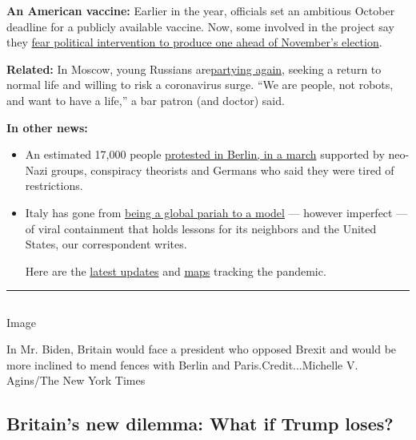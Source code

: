 \textbf{An American vaccine:} Earlier in the year, officials set an
ambitious October deadline for a publicly available vaccine. Now, some
involved in the project say they
\href{https://www.nytimes.com/2020/08/02/us/politics/coronavirus-vaccine.html}{fear
political intervention to produce one ahead of November's election}.

\textbf{Related:} In Moscow, young Russians
are\href{https://www.nytimes.com/2020/08/01/world/europe/russia-moscow-coronavirus.html}{partying
again}, seeking a return to normal life and willing to risk a
coronavirus surge. ``We are people, not robots, and want to have a
life,'' a bar patron (and doctor) said.

\textbf{In other news:}

\begin{itemize}
\item
  An estimated 17,000 people
  \href{https://www.nytimes.com/video/world/europe/100000007268465/coronavirus-protest-germany.html}{protested
  in Berlin, in a march} supported by neo-Nazi groups, conspiracy
  theorists and Germans who said they were tired of restrictions.
\item
  Italy has gone from
  \href{https://www.nytimes.com/2020/07/31/world/europe/italy-coronavirus-reopening.html}{being
  a global pariah to a model} --- however imperfect --- of viral
  containment that holds lessons for its neighbors and the United
  States, our correspondent writes.

  Here are the
  \href{https://www.nytimes.com/2020/08/02/world/coronavirus-covid-19.html}{latest
  updates} and
  \href{https://www.nytimes.com/interactive/2020/world/coronavirus-maps.html}{maps}
  tracking the pandemic.
\end{itemize}

\begin{center}\rule{0.5\linewidth}{\linethickness}\end{center}

\subsection{}

Image

In Mr. Biden, Britain would face a president who opposed Brexit and
would be more inclined to mend fences with Berlin and
Paris.Credit...Michelle V. Agins/The New York Times

\hypertarget{britains-new-dilemma-what-if-trump-loses}{%
\subsection{Britain's new dilemma: What if Trump
loses?}\label{britains-new-dilemma-what-if-trump-loses}}

